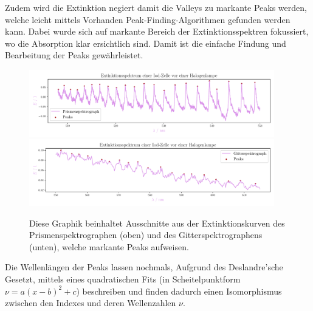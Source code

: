 \documentclass[12pt,english,ngerman]{scrartcl}
\begin{document}
Zudem wird die Extinktion negiert damit die Valleys zu markante Peaks werden,
welche leicht mittels Vorhanden Peak-Finding-Algorithmen gefunden werden kann.
Dabei wurde sich auf markante Bereich der Extinktionsspektren fokussiert, wo
die Absorption klar ersichtlich sind. Damit ist die einfache Findung und
Bearbeitung der Peaks gewährleistet.

\begin{figure}[H]
	\begin{center}
		\includegraphics[width=0.95\textwidth]{figures/prism_ausschnitt_extinction.pdf}
		\includegraphics[width=0.95\textwidth]{figures/gitter_ausschnitt_extinction.pdf}
	\end{center}
	\caption{Diese Graphik beinhaltet Ausschnitte aus der Extinktionskurven
		des Prismenspektrographen (oben) und des Gitterspektrographens 
		(unten), welche markante Peaks aufweisen.
	}\label{fig:ausschnittPeaks}
\end{figure}

Die Wellenlängen der Peaks lassen nochmals, Aufgrund des Deslandre'sche
Gesetzt, mittels eines quadratischen Fits (in Scheitelpunktform $\nu = a
	(x-b)^2 + c$) beschreiben und finden dadurch einen Isomorphismus zwischen den
Indexes und deren Wellenzahlen $\nu$.
\end{document}

